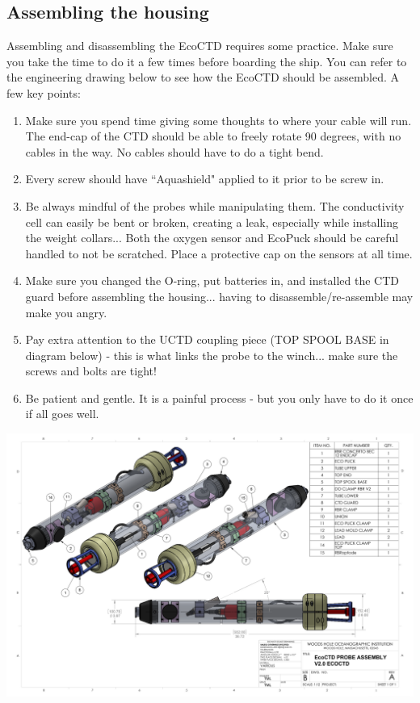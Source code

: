 \documentclass[13pt]{article}
\begin{document}
\subsection{Assembling the housing}
Assembling and disassembling the EcoCTD requires some practice. Make sure you take the time to do it a few times before boarding the ship. You can refer to the engineering drawing below to see how the EcoCTD should be assembled. A few key points:
\begin{enumerate}
    \item Make sure you spend time giving some thoughts to where your cable will run. The end-cap of the CTD should be able to freely rotate 90 degrees, with no cables in the way. No cables should have to do a tight bend.
    \item Every screw should have ``Aquashield" applied to it prior to be screw in.
    \item Be always mindful of the probes while manipulating them. The conductivity cell can easily be bent or broken, creating a leak, especially while installing the weight collars... Both the oxygen sensor and EcoPuck should be careful handled to not be scratched. Place a protective cap on the sensors at all time.
    \item Make sure you changed the O-ring, put batteries in, and installed the CTD guard before assembling the housing... having to disassemble/re-assemble may make you angry.
    \item Pay extra attention to the UCTD coupling piece (TOP SPOOL BASE in diagram below) - this is what links the probe to the winch... make sure the screws and bolts are tight!
    \item Be patient and gentle. It is a painful process - but you only have to do it once if all goes well.
\end{enumerate}

\begin{center}
    \includegraphics[width = .8\linewidth]{EcoCTD_engineer_diagram.png}
\end{center}
\end{document}
